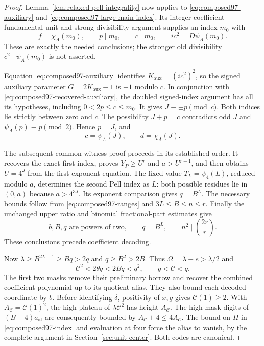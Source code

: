 \begin{proof}
Lemma~\ref{lem:relaxed-pell-integrality} now applies to
\eqref{eq:composed97-auxiliary} and
\eqref{eq:composed97-large-main-index}. Its integer-coefficient
fundamental-unit and strong-divisibility argument supplies an index
$m_0$ with
\begin{equation}\label{eq:composed97-recovered-auxiliary}
 f=\chi_A(m_0),\qquad p\mid m_0,\qquad c\mid m_0,
 \qquad ic^2=D\psi_A(m_0).
\end{equation}
These are exactly the needed conclusions; the stronger old
divisibility $c^2\mid\psi_A(m_0)$ is not asserted.

Equation \eqref{eq:composed97-auxiliary} identifies
$K_{\mathrm{aux}}=(ic^2)^2$, so the signed auxiliary parameter
$G=2K_{\mathrm{aux}}-1$ is $-1$ modulo $c$. In conjunction with
\eqref{eq:composed97-recovered-auxiliary}, the doubled signed-index
argument has all its hypotheses, including
$0<2p\le c\le m_0$. It gives $J\equiv\pm p\pmod c$.
Both indices lie strictly between zero and $c$. The possibility
$J+p=c$ contradicts odd $J$ and $\psi_A(p)\equiv p\pmod2$.
Hence $p=J$, and
\[
 c=\psi_A(J),\qquad d=\chi_A(J).
\]

The subsequent common-witness proof proceeds in its established
order. It recovers the exact first index, proves $Y_P\ge U^r$ and
$a>U^{r+1}$, and then obtains $U=4^J$ from the first exponent
equation. The fixed value $T_L=\psi_4(L)$, reduced modulo $a$,
determines the second Pell index as $L$: both possible residues lie
in $(0,a)$ because $a>4^{3J}$. Its exponent comparison gives
$q=B^L$. The necessary bounds follow from
\eqref{eq:composed97-ranges} and $3L\le B\le n\le r$.
Finally the unchanged upper ratio and binomial fractional-part
estimates give
\begin{equation}\label{eq:composed97-binomial}
 b,B,q\text{ are powers of two},\qquad
 q=B^L,\qquad n^2\mid\binom{2r}{r}.
\end{equation}
These conclusions precede coefficient decoding.

Now $\lambda\ge B^{2L-1}\ge Bq>2q$ and $q\ge B^2>2B$.
Thus $\Omega=\lambda-e>\lambda/2$ and
\[
 \mathcal C^2<2\theta q<2Bq<q^2,
 \qquad g<\mathcal C<q.
\]
The first two masks remove their preliminary borrow and recover the
combined coefficient polynomial up to its quotient alias. They
also bound each decoded coordinate by $b$. Before identifying
$\delta$, positivity of $x,g$ gives $\mathcal C(1)\ge2$.
With $A_{\mathcal C}=\mathcal C(1)^2$, the high plateau of
$\lambda\mathcal C^2$ has height $A_{\mathcal C}$. The high-mask
digits of $(B-4)a_{\mathrm{al}}$ are consequently bounded by
$A_{\mathcal C}+4\le4A_{\mathcal C}$. The bound on $H$ in
\eqref{eq:composed97-index} and evaluation at four force the alias
to vanish, by the complete argument in Section~\ref{sec:unit-center}.
Both codes are canonical.


\end{proof}
